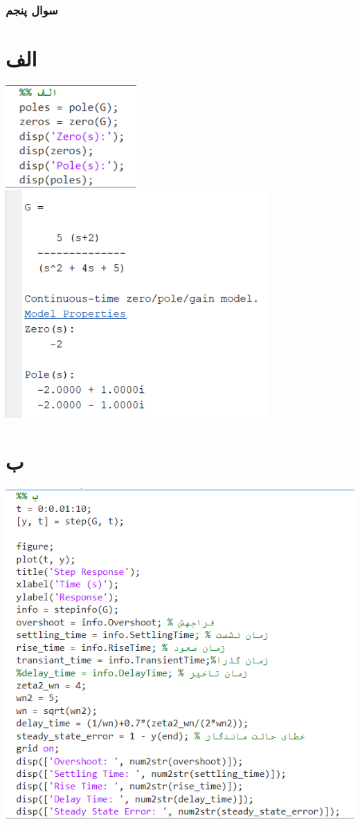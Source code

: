 \documentclass[a4,12pt]{article}
\begin{document}
	\section{سوال پنجم}{
         \part{الف}{
         	\includegraphics[width=5cm]{Capture.png}
         	\includegraphics[width=10cm]{output_a.png}
         }
            \part{ب}{
          	\includegraphics[width=15cm]{Capture1.png}
          	
}}
\end{document}
